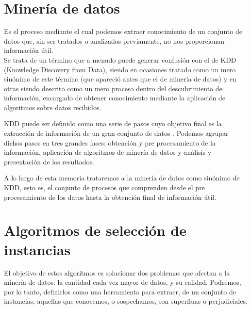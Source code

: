 

\section{Minería de datos}

Es el proceso mediante el cual podemos extraer conocimiento de un conjunto de datos que, sin ser tratados o analizados previamente, no nos proporcionan información útil. \cite{DataMiningConcepts} \\

Se trata de un término que a menudo puede generar confusión con el de KDD (Knowledge Discovery from Data), siendo en ocasiones tratado como un mero sinónimo de este término (que apareció antes que el de minería de datos) y en otras siendo descrito como un mero proceso dentro del descubrimiento de información, encargado de obtener conocimiento mediante la aplicación de algoritmos sobre datos recibidos. \cite{DataMiningConcepts}

KDD puede ser definido como una serie de pasos cuyo objetivo final es la extracción de información de un gran conjunto de datos \cite{DataMiningConcepts}. Podemos agrupar dichos pasos en tres grandes fases: obtención y pre procesamiento de la información, aplicación de algoritmos de minería de datos y análisis y presentación de los resultados.

A lo largo de esta memoria trataremos a la minería de datos como sinónimo de KDD, esto es, el conjunto de procesos que comprenden desde el pre procesamiento de los datos hasta la obtención final de información útil.


\section{Algoritmos de selección de instancias}\label{sec:DefAlgSel}

El objetivo de estos algoritmos es solucionar dos problemas que afectan a la minería de datos: la cantidad cada vez mayor de datos, y su calidad. Podremos, por lo tanto,  definirlos como una herramienta para extraer, de un conjunto de instancias, aquellas que conocemos, o sospechamos, son superfluas o perjudiciales.\cite{IntroInstanceSelect}

